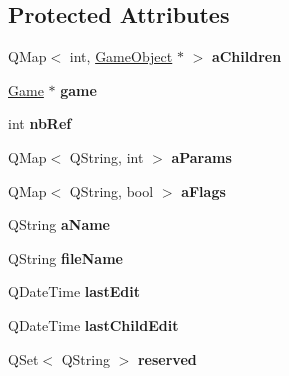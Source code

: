 \subsection*{\-Protected \-Attributes}
\begin{DoxyCompactItemize}
\item 
\hypertarget{class_game_object_ac0f8f486901d9e799b8d171ad26742ad}{\-Q\-Map$<$ int, \hyperlink{class_game_object}{\-Game\-Object} $\ast$ $>$ {\bfseries a\-Children}}\label{class_game_object_ac0f8f486901d9e799b8d171ad26742ad}

\item 
\hypertarget{class_game_object_a338ed91d0ad6aebe8a8d3adf8c75752b}{\hyperlink{class_game}{\-Game} $\ast$ {\bfseries game}}\label{class_game_object_a338ed91d0ad6aebe8a8d3adf8c75752b}

\item 
\hypertarget{class_game_object_a1873810f18db1e1faecc04e0ab92c512}{int {\bfseries nb\-Ref}}\label{class_game_object_a1873810f18db1e1faecc04e0ab92c512}

\item 
\hypertarget{class_game_object_ab5ed36754a777ef648dd6831c0b1d6fb}{\-Q\-Map$<$ \-Q\-String, int $>$ {\bfseries a\-Params}}\label{class_game_object_ab5ed36754a777ef648dd6831c0b1d6fb}

\item 
\hypertarget{class_game_object_ade46e4f590a01cab331d12d0da644625}{\-Q\-Map$<$ \-Q\-String, bool $>$ {\bfseries a\-Flags}}\label{class_game_object_ade46e4f590a01cab331d12d0da644625}

\item 
\hypertarget{class_game_object_aad00b615f4d3c6d4d743ff2f8c27a359}{\-Q\-String {\bfseries a\-Name}}\label{class_game_object_aad00b615f4d3c6d4d743ff2f8c27a359}

\item 
\hypertarget{class_game_object_a8e62a0d6755b2930090348622f482f6d}{\-Q\-String {\bfseries file\-Name}}\label{class_game_object_a8e62a0d6755b2930090348622f482f6d}

\item 
\hypertarget{class_game_object_ac1a61f57d5a318b86c4f2bbb4dbde78f}{\-Q\-Date\-Time {\bfseries last\-Edit}}\label{class_game_object_ac1a61f57d5a318b86c4f2bbb4dbde78f}

\item 
\hypertarget{class_game_object_ae0a43c76fc9171015b43d008b5ffcbfd}{\-Q\-Date\-Time {\bfseries last\-Child\-Edit}}\label{class_game_object_ae0a43c76fc9171015b43d008b5ffcbfd}

\item 
\hypertarget{class_game_object_a66ba1ad1dca3c7b2ae424407fce76d66}{\-Q\-Set$<$ \-Q\-String $>$ {\bfseries reserved}}\label{class_game_object_a66ba1ad1dca3c7b2ae424407fce76d66}

\end{DoxyCompactItemize}


